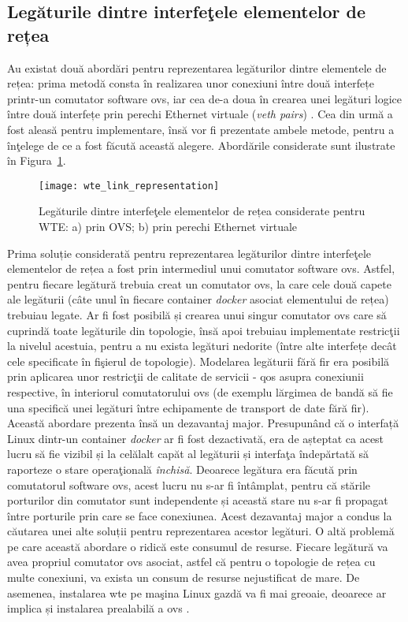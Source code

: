 \subsection{Legăturile dintre interfeţele elementelor de rețea}

Au existat două abordări pentru reprezentarea legăturilor dintre elementele de rețea: prima metodă consta în realizarea unor conexiuni între două interfețe printr-un comutator software \gls{ovs}, iar cea de-a doua în crearea unei legături logice între două interfețe prin perechi Ethernet virtuale (\textit{veth pairs}) \cite{linuxnetworking2016}. Cea din urmă a fost aleasă pentru implementare, însă vor fi prezentate ambele metode, pentru a înţelege de ce a fost făcută această alegere. Abordările considerate sunt ilustrate în Figura~\ref{fig:wte_link_representation}.

\begin{figure}[h]
	\centering
	\texttt{[image: wte\_link\_representation]}
	\caption{Legăturile dintre interfeţele elementelor de rețea considerate pentru WTE: a) prin OVS; b) prin perechi Ethernet virtuale}
	\label{fig:wte_link_representation}
\end{figure}

Prima soluție considerată pentru reprezentarea legăturilor dintre interfeţele elementelor de rețea a fost prin intermediul unui comutator software \gls{ovs}. Astfel, pentru fiecare legătură trebuia creat un comutator \gls{ovs}, la care cele două capete ale legăturii (câte unul în fiecare container \textit{docker} asociat elementului de rețea) trebuiau legate. Ar fi fost posibilă și crearea unui singur comutator \gls{ovs} care să cuprindă toate legăturile din topologie, însă apoi trebuiau implementate restricţii la nivelul acestuia, pentru a nu exista legături nedorite (între alte interfețe decât cele specificate în fişierul de topologie). Modelarea legăturii fără fir era posibilă prin aplicarea unor restricţii de calitate de servicii - \gls{qos} asupra conexiunii respective, în interiorul comutatorului \gls{ovs} (de exemplu lărgimea de bandă să fie una specifică unei legături între echipamente de transport de date fără fir). Această abordare prezenta însă un dezavantaj major. Presupunând că o interfață Linux dintr-un container \textit{docker} ar fi fost dezactivată, era de așteptat ca acest lucru să fie vizibil și la celălalt capăt al legăturii și interfaţa îndepărtată să raporteze o stare operaţională \textit{închisă}. Deoarece legătura era făcută prin comutatorul software \gls{ovs}, acest lucru nu s-ar fi întâmplat, pentru că stările porturilor din comutator sunt independente și această stare nu s-ar fi propagat între porturile prin care se face conexiunea. Acest dezavantaj major a condus la căutarea unei alte soluții pentru reprezentarea acestor legături. O altă problemă pe care această abordare o ridică este consumul de resurse. Fiecare legătură va avea propriul comutator \gls{ovs} asociat, astfel că pentru o topologie de rețea cu multe conexiuni, va exista un consum de resurse nejustificat de mare. De asemenea, instalarea \gls{wte} pe maşina Linux gazdă va fi mai greoaie, deoarece ar implica și instalarea prealabilă a \gls{ovs} \cite{pfaff2015design}.


